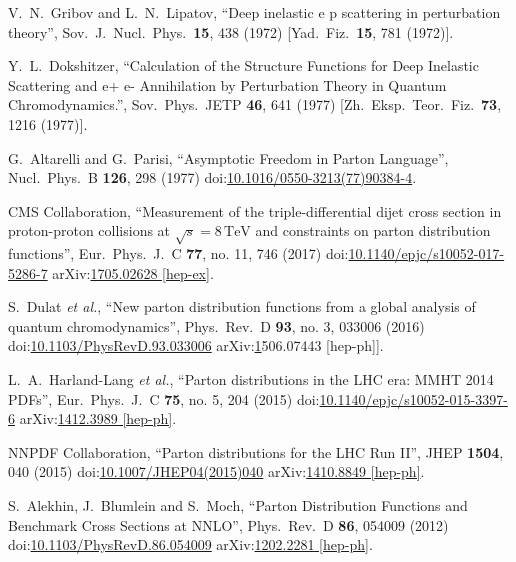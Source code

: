 \begin{thebibliography}{99}
V.~N.~Gribov and L.~N.~Lipatov, ``Deep inelastic e p scattering in perturbation theory'', Sov.\ J.\ Nucl.\ Phys.\ {\bf 15}, 438 (1972) [Yad.\ Fiz.\ {\bf 15}, 781 (1972)].

Y.~L.~Dokshitzer, ``Calculation of the Structure Functions for Deep Inelastic Scattering and e+ e- Annihilation by Perturbation Theory in Quantum Chromodynamics.'', Sov.\ Phys.\ JETP {\bf 46}, 641 (1977) [Zh.\ Eksp.\ Teor.\ Fiz.\ {\bf 73}, 1216 (1977)].

G.~Altarelli and G.~Parisi, ``Asymptotic Freedom in Parton Language'', Nucl.\ Phys.\ B {\bf 126}, 298 (1977) doi:\href{http://dx.doi.org/10.1016/0550-3213(77)90384-4}{10.1016/0550-3213(77)90384-4}.

CMS Collaboration, ``Measurement of the triple-differential dijet cross section in proton-proton collisions at $\sqrt{s}=8\,\text {TeV} $ and constraints on parton distribution functions'', Eur.\ Phys.\ J.\ C {\bf 77}, no. 11, 746 (2017) doi:\href{http://dx.doi.org/10.1140/epjc/s10052-017-5286-7}{10.1140/epjc/s10052-017-5286-7} arXiv:\href{https://arxiv.org/abs/1705.02628}{1705.02628 [hep-ex]}.

S.~Dulat {\it et al.}, ``New parton distribution functions from a global analysis of quantum chromodynamics'', Phys.\ Rev.\ D {\bf 93}, no. 3, 033006 (2016) doi:\href{http://dx.doi.org/10.1103/PhysRevD.93.033006}{10.1103/PhysRevD.93.033006} arXiv:\href{https://arxiv.org/abs/1506.07443}1506.07443 [hep-ph]].

L.~A.~Harland-Lang {\it et al.}, ``Parton distributions in the LHC era: MMHT 2014 PDFs'', Eur.\ Phys.\ J.\ C {\bf 75}, no. 5, 204 (2015) doi:\href{http://dx.doi.org/10.1140/epjc/s10052-015-3397-6}{10.1140/epjc/s10052-015-3397-6} arXiv:\href{https://arxiv.org/abs/1412.3989}{1412.3989 [hep-ph]}.

NNPDF Collaboration, ``Parton distributions for the LHC Run II'', JHEP {\bf 1504}, 040 (2015) doi:\href{http://dx.doi.org/10.1007/JHEP04(2015)040}{10.1007/JHEP04(2015)040} arXiv:\href{https://arxiv.org/abs/1410.8849}{1410.8849 [hep-ph]}.

S.~Alekhin, J.~Blumlein and S.~Moch, ``Parton Distribution Functions and Benchmark Cross Sections at NNLO'', Phys.\ Rev.\ D {\bf 86}, 054009 (2012) doi:\href{http://dx.doi.org/10.1103/PhysRevD.86.054009}{10.1103/PhysRevD.86.054009} arXiv:\href{https://arxiv.org/abs/1202.2281}{1202.2281 [hep-ph]}.


\end{thebibliography}
